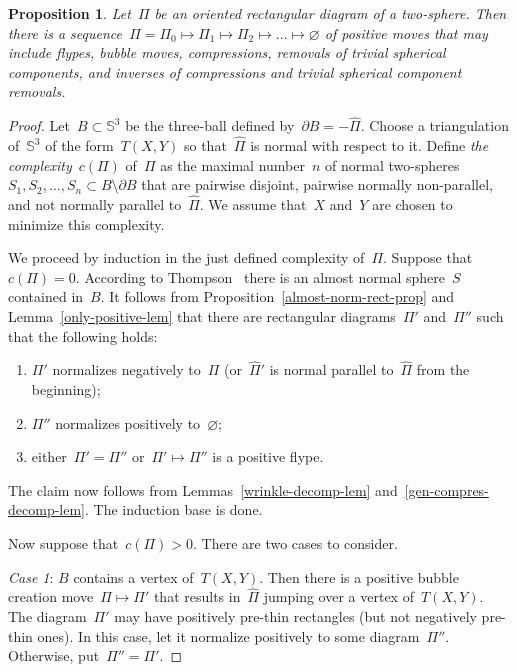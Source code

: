 \documentclass{amsart}
\theoremstyle{theorem}
\newtheorem{prop}[theo]{Proposition}
\theoremstyle{remark}
\theoremstyle{definition}
\numberwithin{equation}{section}
\numberwithin{figure}{section}
\begin{document}
\begin{prop}\label{shrink-sphere-prop}
Let~$\Pi$ be an oriented rectangular diagram of a two-sphere. Then there is a sequence~$\Pi=\Pi_0\mapsto\Pi_1\mapsto\Pi_2\mapsto\ldots
\mapsto\varnothing$ of positive moves that may include flypes, bubble  moves, compressions, removals of trivial spherical components, and inverses of compressions and trivial spherical component removals.
\end{prop}

\begin{proof}
Let~$B\subset\mathbb S^3$ be the three-ball defined by~$\partial B=-\widehat\Pi$.
Choose a triangulation of~$\mathbb S^3$ of the form~$T(X,Y)$ so that~$\widehat\Pi$ is normal
with respect to it. Define \emph{the complexity}~$c(\Pi)$ of~$\Pi$ as the maximal number~$n$
of normal two-spheres~$S_1,S_2,\ldots,S_n\subset B{}\setminus\partial B$ that are pairwise disjoint, pairwise normally non-parallel,
and not normally parallel to~$\widehat\Pi$. We assume that~$X$ and~$Y$ are chosen to minimize
this complexity.

We proceed by induction in the just defined complexity of~$\Pi$.
Suppose that~$c(\Pi)=0$. According to Thompson~\cite{thompson} there is an almost normal
sphere~$S$ contained in~$B$. It follows from Proposition~\ref{almost-norm-rect-prop} and Lemma~\ref{only-positive-lem}
that there are rectangular diagrams~$\Pi'$ and~$\Pi''$ such that the following holds:
\begin{enumerate}
\item
$\Pi'$ normalizes negatively to~$\Pi$ (or~$\widehat\Pi'$ is normal parallel to~$\widehat\Pi$ from the beginning);
\item
$\Pi''$ normalizes positively to~$\varnothing$;
\item
either~$\Pi'=\Pi''$ or~$\Pi'\mapsto\Pi''$ is a positive flype.
\end{enumerate}
The claim now follows from Lemmas~\ref{wrinkle-decomp-lem} and~\ref{gen-compres-decomp-lem}.
The induction base is done.

Now suppose that~$c(\Pi)>0$. There are two cases to consider.

\smallskip\noindent\emph{Case 1}: $B$ contains a vertex of~$T(X,Y)$. Then there is a positive
bubble creation move~$\Pi\mapsto\Pi'$ that results in~$\widehat\Pi$ jumping over
a vertex of~$T(X,Y)$. The diagram~$\Pi'$ may have positively pre-thin rectangles (but
not negatively pre-thin ones). In this case, let it normalize positively
to some diagram~$\Pi''$. Otherwise, put~$\Pi''=\Pi'$. 


\end{proof}
\end{document}
